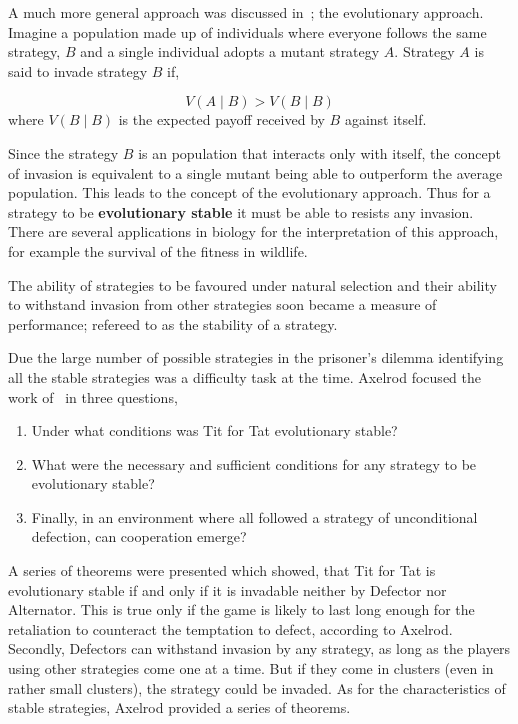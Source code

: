 \documentclass{article}
\theoremstyle{definition}
\begin{document}
A much more general approach was discussed in~\cite{axelrod1981}; the evolutionary
approach. Imagine a population made up of individuals where everyone follows the
same strategy, \(B\) and a single individual adopts a mutant strategy \(A\).
Strategy \(A\) is said to invade strategy \(B\) if,

\begin{equation}
V(A \mid B) > V(B \mid B)
\end{equation}
where \(V(B \mid B)\) is the expected payoff received by \(B\) against itself.

Since the strategy \(B\) is an population that interacts only with itself,
the concept of invasion is equivalent to a single mutant being able to outperform
the average population. This leads to the concept of the evolutionary approach.
Thus for a strategy to be \textbf{evolutionary stable} it must be able to
resists any invasion. There are several applications in biology for the interpretation
of this approach, for example the survival of the fitness in wildlife.

The ability of strategies to be favoured under natural selection and their
ability to withstand invasion from other strategies soon became a measure
of performance; refereed to as the stability of a strategy.

Due the large number of possible strategies in the prisoner's dilemma identifying
all the stable strategies was a difficulty task at the time. Axelrod focused
the work of~\cite{axelrod1981} in three questions,

\begin{enumerate}
    \item Under what conditions was Tit for Tat evolutionary stable?
    \item What were the necessary and sufficient conditions for any strategy to be
    evolutionary stable?
    \item Finally, in an environment where all followed a strategy of unconditional
    defection, can cooperation emerge?
\end{enumerate}

A series of theorems were presented which showed, that Tit for Tat is evolutionary
stable if and only if it is invadable neither by Defector nor Alternator. This
is true only if the game is likely to last long enough for the retaliation
to counteract the temptation to defect, according to Axelrod. Secondly,
Defectors can withstand invasion by any strategy, as long as the players using
other strategies come one at a time. But if they come in clusters (even in rather small
clusters), the strategy could be invaded. As for the characteristics of stable
strategies, Axelrod provided a series of theorems.
\end{document}
